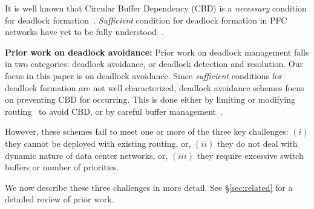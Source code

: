 It is well known that Circular Buffer Dependency (CBD) is a {\em necessary}
condition for deadlock formation~\cite{tcp-bolt,hu2016deadlocks}. {\em
Sufficient} condition for deadlock formation in PFC networks have yet to be
fully understood~\cite{hu2016deadlocks}. 

{\bf Prior work on deadlock avoidance:} Prior work on deadlock management falls
in two categories: deadlock avoidance, or deadlock detection and resolution. Our
focus in this paper is on deadlock avoidance.  Since {\em sufficient} conditions
for deadlock formation are not well characterized, deadlock avoidance schemes
focus on preventing CBD for occurring. This is done either by limiting or
modifying routing~\cite{tcpbolt} to avoid CBD, or by careful buffer
management~\cite{xxx}. 

However, these schemes fail to meet one or more of the three key challenges:
$(i)$ they cannot be deployed with existing routing, or, $(ii)$ they do not deal
with dynamic nature of data center networks, or, $(iii)$ they require excessive
switch buffers or number of priorities. 

We now describe these three challenges in more detail. See \S\ref{sec:related}
for a detailed review of prior work.





